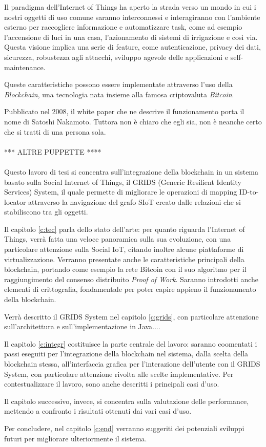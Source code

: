 Il paradigma dell'Internet of Things ha aperto la strada verso un mondo in cui i nostri oggetti di uso comune saranno interconnessi e interagiranno con l'ambiente esterno per raccogliere informazione e automatizzare task, come ad esempio l'accensione di luci in una casa, l'azionamento di sistemi di irrigazione e così via. Questa visione implica una serie di feature, come autenticazione, privacy dei dati, sicurezza, robustezza agli attacchi, sviluppo agevole delle applicazioni e self-maintenance\cite{Fernandez-Carames2018}.

Queste caratteristiche possono essere implementate attraverso l'uso della \textit{Blockchain}, una tecnologia nata insieme alla famosa criptovaluta \textit{Bitcoin}. 

Pubblicato nel 2008, il white paper\cite{Nakamoto2008} che ne descrive il funzionamento porta il nome di Satoshi Nakamoto. Tuttora non è chiaro che egli sia, non è neanche certo che si tratti di una persona sola. \\

\\ *** ALTRE PUPPETTE **** \\

\\

Questo lavoro di tesi si concentra sull'integrazione della blockchain in un sistema basato sulla Social Internet of Things, il GRIDS (Generic Resilient Identity Services) System, il quale permette di migliorare le operazioni di mapping ID-to-locator attraverso la navigazione del grafo SIoT creato dalle relazioni che si stabiliscono tra gli oggetti.

Il capitolo \ref{c:tec} parla dello stato dell'arte: per quanto riguarda l'Internet of Things, verrà fatta una veloce panoramica sulla sua evoluzione, con una particolare attenzione sulla Social IoT, citando inoltre alcune piattaforme di virtualizzazione. Verranno presentate anche le caratteristiche principali della blockchain, portando come esempio la rete Bitcoin con il suo algoritmo per il raggiungimento del consenso distribuito \textit{Proof of Work}. 
Saranno introdotti anche elementi di crittografia, fondamentale per poter capire appieno il funzionamento della blockchain.

Verrà descritto il GRIDS System nel capitolo \ref{c:grids}, con particolare attenzione sull'architettura e sull'implementazione in Java....

Il capitolo \ref{c:integr} costituisce la parte centrale del lavoro: saranno coomentati i passi eseguiti per l'integrazione della blockchain nel sistema, dalla scelta della blockchain stessa, all'interfaccia grafica per l'interazione dell'utente con il GRIDS System, con particolare attenzione rivolta alle scelte implementative. Per contestualizzare il lavoro, sono anche descritti i principali casi d'uso.

Il capitolo successivo, invece, si concentra sulla valutazione delle performance, mettendo a confronto i risultati ottenuti dai vari casi d'uso.

Per concludere, nel capitolo \ref{c:end} verranno suggeriti dei potenziali sviluppi futuri per migliorare ulteriormente il sistema.